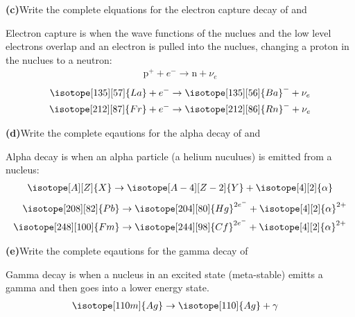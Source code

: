 \documentclass[11pt]{article}
\renewcommand{\part}[1] {\vspace{.10in} {\bf (#1)}}
\begin{document}
\part{c}{Write the complete elquations for the electron capture decay of  and }

Electron capture is when the wave functions of the nuclues and the low level electrons overlap and an electron is pulled into the nuclues, changing a proton in the nuclues to a neutron:
\begin{align*}
    \text{p}^{+} + e^{-} \to \text{n} + \nu_e
\end{align*}
\begin{align}
    \isotope[135][57]{La} +e^{-} &\to \isotope[135][56]{Ba}^{-} + \nu_e \\
    \isotope[212][87]{Fr} +e^{-} &\to \isotope[212][86]{Rn}^{-} + \nu_e
\end{align}


\part{d}{Write the complete eqautions for the alpha decay of  and }

Alpha decay is when an alpha particle (a helium nuculues) is emitted from a nucleus:
\begin{align*}
    \isotope[A][Z]{X} \to \isotope[A-4][Z-2]{Y} + \isotope[4][2]{\mathnormal{\alpha}}
\end{align*}
\begin{align}
    \isotope[208][82]{Pb} &\to \isotope[204][80]{Hg}^{2e^{-}} + \isotope[4][2]{\mathnormal{\alpha}}^{2+} \\ 
    \isotope[248][100]{Fm} &\to \isotope[244][98]{Cf}^{2e^{-}} + \isotope[4][2]{\mathnormal{\alpha}}^{2+} 
\end{align}


\part{e}{Write the complete eqautions for the gamma decay of }

Gamma decay is when a nucleus in an excited state (meta-stable) emitts a gamma and then goes into a lower energy state.
\begin{align}
    \isotope[110m]{Ag} &\to \isotope[110]{Ag} + \gamma
\end{align}
\end{document}
